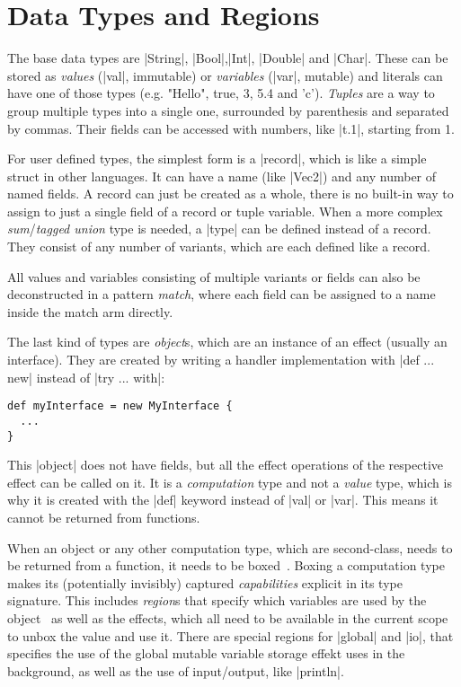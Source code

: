 \section{Data Types and Regions}

The base data types are |String|, |Bool|,|Int|, |Double| and |Char|. These can be stored as \textit{values} (|val|, immutable) or \textit{variables} (|var|, mutable) and literals can have one of those types (e.g. "Hello", true, 3, 5.4 and 'c'). \textit{Tuples} are a way to group multiple types into a single one, surrounded by parenthesis and separated by commas. Their fields can be accessed with numbers, like |t.1|, starting from 1.

For user defined types, the simplest form is a |record|, which is like a simple struct in other languages. It can have a name (like |Vec2|) and any number of named fields. A record can just be created as a whole, there is no built-in way to assign to just a single field of a record or tuple variable. When a more complex \textit{sum}/\textit{tagged union} type is needed, a |type| can be defined instead of a record. They consist of any number of variants, which are each defined like a record.

All values and variables consisting of multiple variants or fields can also be deconstructed in a pattern \textit{match}, where each field can be assigned to a name inside the match arm directly.

The last kind of types are \textit{object}s, which are an instance of an effect (usually an interface). They are created by writing a handler implementation with |def ... new| instead of |try ... with|:

\begin{lstlisting}
def myInterface = new MyInterface {
  ...
}
\end{lstlisting}

This |object| does not have fields, but all the effect operations of the respective effect can be called on it. It is a \textit{computation} type and not a \textit{value} type, which is why it is created with the |def| keyword instead of |val| or |var|. This means it cannot be returned from functions.

When an object or any other computation type, which are second-class, needs to be returned from a function, it needs to be boxed~\cite{brachthauser2022effects}. Boxing a computation type makes its (potentially invisibly) captured \textit{capabilities} explicit in its type signature. This includes \textit{region}s that specify which variables are used by the object~\cite{muller2023capabilities} as well as the effects, which all need to be available in the current scope to unbox the value and use it. There are special regions for |global| and |io|, that specifies the use of the global mutable variable storage effekt uses in the background, as well as the use of input/output, like |println|.

